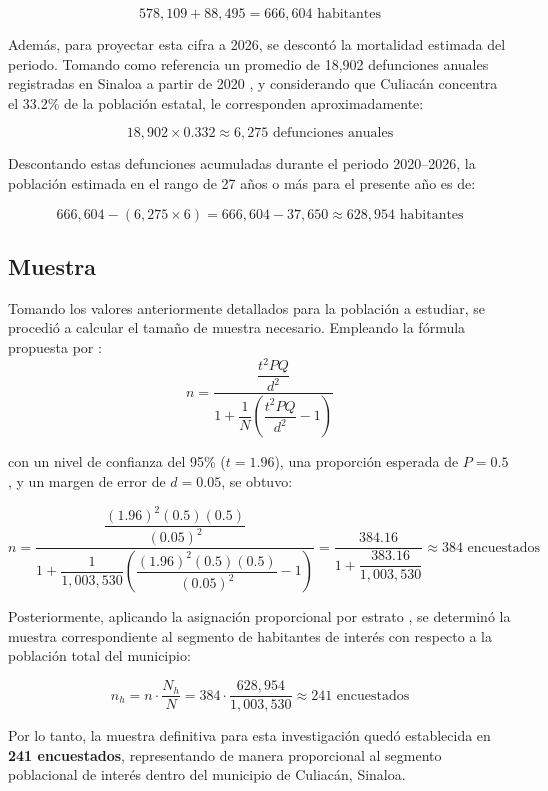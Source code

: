 \[
578{,}109 + 88{,}495 = 666{,}604 \text{ habitantes}
\]

Además, para proyectar esta cifra a 2026, se descontó la mortalidad estimada del
periodo. Tomando como referencia un promedio de 18,902 defunciones anuales
registradas en Sinaloa a partir de 2020 \parencite{inegi_mortalidad}, y
considerando que Culiacán concentra el 33.2\% de la población estatal, le
corresponden aproximadamente:

\[
18{,}902 \times 0.332 \approx 6{,}275 \text{ defunciones anuales}
\]

Descontando estas defunciones acumuladas durante el periodo 2020--2026, la
población estimada en el rango de 27 años o más para el presente año es de:

\[
666{,}604 - (6{,}275 \times 6) = 666{,}604 - 37{,}650 \approx 628{,}954 
\text{ habitantes}
\]

\subsection{Muestra}\label{sec:muestra}

Tomando los valores anteriormente detallados para la población a estudiar, se
procedió a calcular el tamaño de muestra necesario. Empleando la fórmula
propuesta por \textcite[p.~75]{cochran1977}:
\[
n = \frac{\dfrac{t^2 PQ}{d^2}}{1 + \dfrac{1}{N}\left(\dfrac{t^2 PQ}{d^2} - 1\right)}
\]

\noindent con un nivel de confianza del 95\% ($t = 1.96$), una proporción
esperada de $P = 0.5$, y un margen de error de $d = 0.05$, se obtuvo:

\[
n = \frac{\dfrac{(1.96)^2 (0.5)(0.5)}{(0.05)^2}}{1 + \dfrac{1}{1{,}003{,}530}
\left(\dfrac{(1.96)^2 (0.5)(0.5)}{(0.05)^2} - 1\right)}
= \frac{384.16}{1 + \dfrac{383.16}{1{,}003{,}530}} \approx 384 \textrm{ encuestados}
\]

Posteriormente, aplicando la asignación proporcional por estrato
\parencite[p.~91]{cochran1977}, se determinó la muestra correspondiente al
segmento de habitantes de interés con respecto a la población total del
municipio:

\[
n_h = n \cdot \frac{N_h}{N} = 384 \cdot \frac{628{,}954}{1{,}003{,}530} 
\approx 241 \textrm{ encuestados}
\]

Por lo tanto, la muestra definitiva para esta investigación quedó establecida en
\textbf{241 encuestados}, representando de manera proporcional al segmento
poblacional de interés dentro del municipio de Culiacán, Sinaloa.

